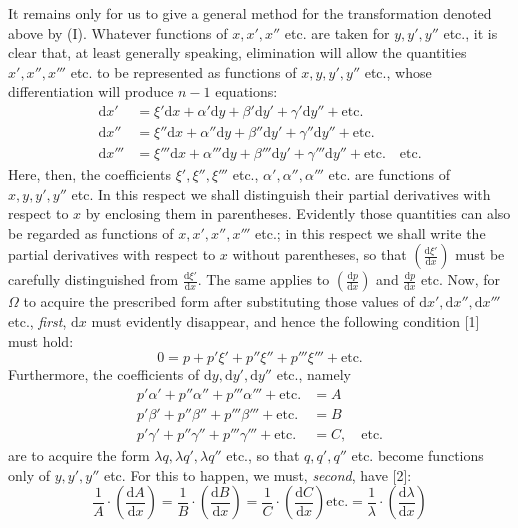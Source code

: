 It remains only for us to give a general method%
 for the transformation denoted above by (I). Whatever functions of $x,x',x''$ etc. are taken for $y,y',y''$ etc., it is clear that, at least generally speaking, elimination will allow the quantities $x',x'',x'''$ etc. to be represented as functions of $x,y,y',y''$ etc., whose differentiation will produce $n-1$ equations:
\[
\begin{aligned}
\mathrm{d}x'&=\xi'\mathrm{d}x+\alpha'\mathrm{d}y+\beta'\mathrm{d}y'+\gamma'\mathrm{d}y''+\text{etc.}\\
\mathrm{d}x''&=\xi''\mathrm{d}x+\alpha''\mathrm{d}y+\beta''\mathrm{d}y'+\gamma''\mathrm{d}y''+\text{etc.}\\
\mathrm{d}x'''&=\xi'''\mathrm{d}x+\alpha'''\mathrm{d}y+\beta'''\mathrm{d}y'+\gamma'''\mathrm{d}y''+\text{etc.}\quad\text{etc.}
\end{aligned}
\]
Here, then, the coefficients $\xi',\xi'',\xi'''$ etc., $\alpha',\alpha'',\alpha'''$ etc. are functions of $x,y,y',y''$ etc. In this respect we shall distinguish their partial derivatives with respect to $x$ by enclosing them in parentheses. Evidently those quantities can also be regarded as functions of $x,x',x'',x'''$ etc.; in this respect we shall write the partial derivatives with respect to $x$ without parentheses, so that $\left(\frac{\mathrm{d}\xi'}{\mathrm{d}x}\right)$ must be carefully distinguished from $\frac{\mathrm{d}\xi'}{\mathrm{d}x}$. The same applies to $\left(\frac{\mathrm{d}p}{\mathrm{d}x}\right)$ and $\frac{\mathrm{d}p}{\mathrm{d}x}$ etc. Now, for $\Omega$ to acquire the prescribed form after substituting those values of $\mathrm{d}x',\mathrm{d}x'',\mathrm{d}x'''$ etc., \emph{first}, $\mathrm{d}x$ must evidently disappear, and hence the following condition [1] must hold:
\[
0=p+p'\xi'+p''\xi''+p'''\xi'''+\text{etc.}
\]
Furthermore, the coefficients of $\mathrm{d}y,\mathrm{d}y',\mathrm{d}y''$ etc., namely
\[
\begin{aligned}
p'\alpha'+p''\alpha''+p'''\alpha'''+\text{etc.}&=A\\
p'\beta'+p''\beta''+p'''\beta'''+\text{etc.}&=B\\
p'\gamma'+p''\gamma''+p'''\gamma'''+\text{etc.}&=C,\quad\text{etc.}
\end{aligned}
\]
are to acquire the form $\lambda q,\lambda q',\lambda q''$ etc., so that $q,q',q''$ etc. become functions only of $y,y',y''$ etc. For this to happen, we must, \emph{second}, have [2]:
\[
\frac{1}{A}\cdot\left(\frac{\mathrm{d}A}{\mathrm{d}x}\right)
=\frac{1}{B}\cdot\left(\frac{\mathrm{d}B}{\mathrm{d}x}\right)
=\frac{1}{C}\cdot\left(\frac{\mathrm{d}C}{\mathrm{d}x}\right)\text{etc.}
=\frac{1}{\lambda}\cdot\left(\frac{\mathrm{d}\lambda}{\mathrm{d}x}\right)
\]
